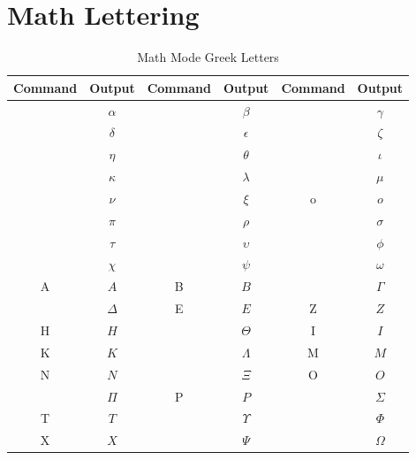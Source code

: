 \chapter{Math Lettering}\label{app:}
\begin{table}[htbp]
	\centering
	\caption{Math Mode Greek Letters}
	\label{tab:greek_letters}
	\begin{tabularx}{\linewidth}{CCCCCC}
		\toprule
			\textbf{Command} & \textbf{Output} & \textbf{Command} & \textbf{Output} & \textbf{Command} & \textbf{Output} \\
		\midrule
			      & \(\alpha\)      &        & \(\beta\)       &       & \(\gamma\)      \\
			      & \(\delta\)      &     & \(\epsilon\)    &        & \(\zeta\)       \\
			        & \(\eta\)        &       & \(\theta\)      &        & \(\iota\)       \\
			      & \(\kappa\)      &      & \(\lambda\)     &          & \(\mu\)         \\
			         & \(\nu\)         &          & \(\xi\)         & {o}              & \(o\)           \\
			         & \(\pi\)         &         & \(\rho\)        &       & \(\sigma\)      \\
			        & \(\tau\)        &     & \(\upsilon\)    &         & \(\phi\)        \\
			        & \(\chi\)        &         & \(\psi\)        &       & \(\omega\)      \\
		\midrule
			A                & \(A\)           & B                & \(B\)           &       & \(\Gamma\)      \\
			      & \(\Delta\)      & E                & \(E\)           & Z                & \(Z\)           \\
			H                & \(H\)           &       & \(\Theta\)      & I                & \(I\)           \\
			K                & \(K\)           &      & \(\Lambda\)     & M                & \(M\)           \\
			N                & \(N\)           &          & \(\Xi\)         & O                & \(O\)           \\
			         & \(\Pi\)         & P                & \(P\)           &       & \(\Sigma\)      \\
			T                & \(T\)           &     & \(\Upsilon\)    &         & \(\Phi\)        \\
			X                & \(X\)           &         & \(\Psi\)        &       & \(\Omega\)      \\
		\bottomrule
	\end{tabularx}
\end{table}


